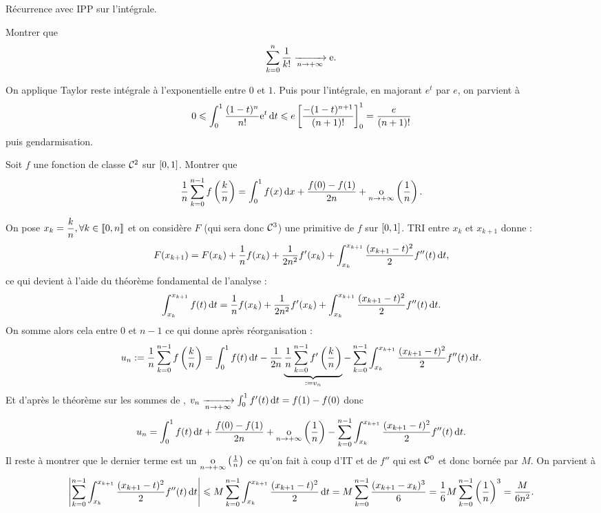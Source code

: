 \documentclass{magnolia}
\begin{document}
\begin{preuve}
Récurrence avec IPP sur l'intégrale.
\end{preuve}

\begin{exos}
\exo[utile=2] Montrer que
  \[\sum_{k=0}^n \frac{1}{k!}\xrightarrow[n\rightarrow +\infty]{}{\rm e}.\]
  \begin{sol}
  On applique Taylor reste intégrale à l'exponentielle entre $0$ et $1$. Puis pour l'intégrale, en majorant $e^t$ par $e$, on parvient à $$0\leqslant \int_{0}^{1} \frac{(1-t)^n}{n!}{\rm e}^t\,\text{d}t\leqslant e\left[ \frac{-(1-t)^{n+1}}{(n+1)!} \right]_{0}^{1}=\frac{e}{(n+1)!}$$ puis gendarmisation.
  \end{sol}
\exo[utile=2] Soit $f$ une fonction de classe $\mathcal{C}^{2}$ sur $\left[0,1\right]$.
  Montrer que
  \[\frac{1}{n}\sum_{k=0}^{n-1} f\left(\frac{k}{n}\right)=\int_{0}^{1} f(x)\,\text{d}x+
    \frac{f(0)-f(1)}{2n}+\underset{n \rightarrow +\infty}{\text{o}}\left(\frac{1}{n}\right).\]
    \begin{sol}
    On pose $x_k=\dfrac{k}{n}, \forall k \in \left\llbracket 0,n\right\rrbracket$ et on considère $F$ (qui sera donc $\mathcal{C}^{3}$) une primitive de $f$ sur $\left[0,1\right]$.
    TRI entre $x_k$ et $x_{k+1}$ donne :
    $$F(x_{k+1})=F(x_k)+\dfrac{1}{n}f(x_k)+\frac{1}{2n^2}f'(x_k)+\int_{x_k}^{x_{k+1}} \frac{(x_{k+1}-t)^2}{2}f''(t)\,\text{d}t,$$
    ce qui devient à l'aide du théorème fondamental de l'analyse :
    $$\int_{x_k}^{x_{k+1}} f(t)\,\text{d}t=\dfrac{1}{n}f(x_k)+\frac{1}{2n^2}f'(x_k)+\int_{x_k}^{x_{k+1}} \frac{(x_{k+1}-t)^2}{2}f''(t)\,\text{d}t.$$
    On somme alors cela entre $0$ et $n-1$ ce qui donne après réorganisation :
    $$u_n:=\frac{1}{n}\sum_{k=0}^{n-1} f\left(\frac{k}{n}\right)=\int_{0}^{1} f(t)\,\text{d}t-\frac{1}{2n}\underbrace{\frac{1}{n}\sum_{k=0}^{n-1} f'\left(\frac{k}{n}\right)}_{:=v_n}-\sum_{k=0}^{n-1}\int_{x_k}^{x_{k+1}} \frac{(x_{k+1}-t)^2}{2}f''(t)\,\text{d}t.$$
    Et d'après le théorème sur les sommes de , $v_n\xrightarrow[n\rightarrow +\infty]{}{\int_{0}^{1} f'(t)\,\text{d}t}=f(1)-f(0)$ donc $$u_n=\int_{0}^{1} f(t)\,\text{d}t+\frac{f(0)-f(1)}{2n}+\underset{n \rightarrow +\infty}{\text{o}}\left(\frac{1}{n}\right)-\sum_{k=0}^{n-1}\int_{x_k}^{x_{k+1}} \frac{(x_{k+1}-t)^2}{2}f''(t)\,\text{d}t.$$
    Il reste à montrer que le dernier terme est un $\underset{n \rightarrow +\infty}{\text{o}}\left(\frac{1}{n}\right)$ ce qu'on fait à coup d'IT et de $f''$ qui est $\mathcal{C}^{0}$ et donc bornée par $M$. On parvient à $$\left|\sum_{k=0}^{n-1}\int_{x_k}^{x_{k+1}} \frac{(x_{k+1}-t)^2}{2}f''(t)\,\text{d}t\right|\leqslant M \sum_{k=0}^{n-1}\int_{x_k}^{x_{k+1}} \frac{(x_{k+1}-t)^2}{2}\,\text{d}t=M \sum_{k=0}^{n-1}\frac{(x_{k+1}-x_k)^3}{6}=\frac{1}{6}M\sum_{k=0}^{n-1}\left(\frac{1}{n}\right)^3=\frac{M}{6n^2}.$$
    
    \end{sol}
\end{exos}
\end{document}
